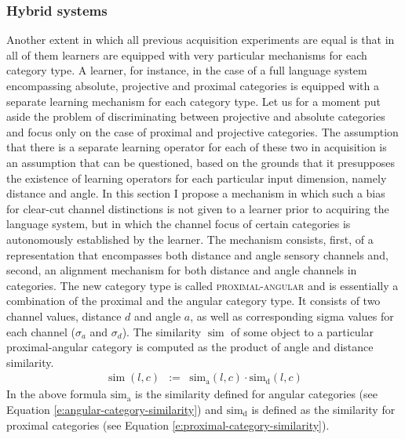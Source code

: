 \subsubsection{Hybrid systems}
Another extent in which all previous acquisition experiments are equal is that
in all of them learners are equipped with very particular mechanisms for 
each category type. A learner, for instance, in the case of a full language 
system encompassing absolute, projective and proximal categories is equipped 
with a separate learning mechanism for each 
category type. Let us for a moment put aside the problem of discriminating
between projective and absolute categories and focus only on the case of 
proximal and projective categories. The assumption that there is a separate
learning operator for each of these two in acquisition is an assumption that can be 
questioned, based on the grounds that it presupposes the existence
of learning operators for each particular input dimension, namely distance and angle. 
In this section I propose a mechanism in which such a bias for clear-cut 
channel distinctions is not given to a learner prior to acquiring
the language system, but in which the channel focus of certain categories
is autonomously established by the learner. The mechanism consists, first, of 
a representation that encompasses both distance and angle sensory channels and, second, 
an alignment mechanism for both distance and angle channels in categories.
The new category type is called \textsc{proximal-angular} and is essentially a combination
of the proximal and the angular category type. It consists of two channel values, 
distance $d$ and angle $a$, as well as corresponding sigma values for each channel
($\sigma_a$ and $\sigma_d$).
The similarity $\operatorname{sim}$ of some object to a 
particular proximal-angular category 
is computed as the product of angle and distance similarity.
\begin{eqnarray}
\label{e:proximal-angular-similarity}
\operatorname{sim}(l,c)&:=& \operatorname{sim_a}(l,c) \cdot \operatorname{sim_d}(l,c)
\end{eqnarray}
In the above formula $\operatorname{sim_a}$ is the similarity defined for  angular categories 
(see Equation \ref{e:angular-category-similarity}) and $\operatorname{sim_d}$ is defined
as the similarity for proximal categories (see Equation \ref{e:proximal-category-similarity}).

